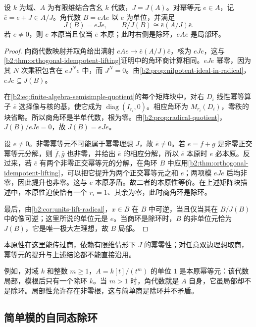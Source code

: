 \begin{proposition}\label{b2:prop:corner-radical}
	设 \(k\) 为域、\(A\) 为有限维结合含幺 \(k\) 代数，\(J=J(A)\)。对幂等元 \(e\in A\)，记 \(\bar e=e+J\in A/J\)。角代数 \(B=eAe\) 以 \(e\) 为单位，并满足
	\[
		J(B)=eJe, \qquad B/J(B)\cong\bar e(A/J)\bar e.
	\]
	若 \(e\ne0\)，则 \(e\) 本原当且仅当 \(\bar e\) 本原；此时右侧是除环，\(eAe\) 是局部环。
\end{proposition}
\begin{proof}
	向商代数映射并取角给出满射 \(eAe\to\bar e(A/J)\bar e\)，核为 \(eJe\)，这与\cref{b2:thm:orthogonal-idempotent-lifting}证明中的角环商计算相同。\(eJe\) 幂零，因为其 \(N\) 次乘积包含在 \(eJ^Ne\) 中，而 \(J^N=0\)。由\cref{b2:prop:nilpotent-ideal-in-radical}，\(eJe\subseteq J(B)\)。

	在\eqref{b2:eq:finite-algebra-semisimple-quotient}的每个矩阵块中，对右 \(D_i\) 线性幂等算子 \(\bar e\) 选择像与核的基，使它成为 \(\operatorname{diag}(I_{r_i},0)\)。相应角环为 \(M_{r_i}(D_i)\)，零秩的块省略。所以商角环是半单代数，根为零。由\cref{b2:prop:radical-quotient}，\(J(B)/eJe=0\)，故 \(J(B)=eJe\)。

	设 \(e\ne0\)。非零幂等元不可能属于幂零理想 \(J\)，故 \(\bar e\ne0\)。若 \(e=f+g\) 是非零正交幂等元分解，则 \(\bar f,\bar g\) 也非零，并给出 \(\bar e\) 的相应分解，所以 \(\bar e\) 本原时 \(e\) 必本原。反过来，若 \(\bar e\) 有两个非零正交幂等元的分解，在角环 \(B\) 中应用\cref{b2:thm:orthogonal-idempotent-lifting}，可以把它提升为两个正交幂等元之和 \(e\)；两项模 \(eJe\) 后均非零，因此提升也非零。这与 \(e\) 本原矛盾。故二者的本原性等价。在上述矩阵块描述中，本原性迫使恰有一个 \(r_i=1\)、其余为零，此时商角环是除环。

	最后，由\cref{b2:cor:units-lift-radical}，\(x\in B\) 在 \(B\) 中可逆，当且仅当其在 \(B/J(B)\) 中的像可逆；这里所说的单位元是 \(e\)。当商环是除环时，\(B\) 的非单位元恰为 \(J(B)\)，它是唯一极大左理想，故 \(B\) 局部。
\end{proof}

本原性在这里能传过商，依赖有限维情形下 \(J\) 的幂零性；对任意双边理想取商，幂等元的提升与上述结论都不能直接沿用。

\ProseParagraphBreak

例如，对域 \(k\) 和整数 \(m\ge1\)，\(A=k[t]/(t^m)\) 的单位 \(1\) 是本原幂等元：该代数局部，模根后只有一个除环 \(k\)。当 \(m>1\) 时，角代数就是 \(A\) 自身，它虽局部却不是除环。局部性允许存在非零根，这与简单商是除环并不矛盾。

\subsection{简单模的自同态除环}
\label{b2:subsec:1504:02}

